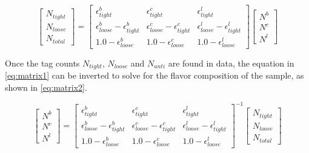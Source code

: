         \begin{equation}
            \begin{bmatrix} \scriptstyle
            N_{tight} \\ \scriptstyle
            N_{loose} \\ \scriptstyle
            N_{total}
            \end{bmatrix}    
            = 
            \begin{bmatrix} \scriptstyle
                \epsilon^b_{tight} & \scriptstyle \epsilon^c_{tight} & \scriptstyle \epsilon^l_{tight} \\  \scriptstyle
                \epsilon^b_{loose} - \epsilon^b_{tight} & \scriptstyle \epsilon^c_{loose} - \epsilon^c_{tight} & \scriptstyle \epsilon^l_{loose} - \epsilon^l_{tight} \\      \scriptstyle
                1.0 - \epsilon^b_{loose} & \scriptstyle 1.0 - \epsilon^c_{loose} & \scriptstyle  1.0 - \epsilon^l_{loose}
            \end{bmatrix}
            \begin{bmatrix} \scriptstyle
                N^b \\ \scriptstyle
                N^c \\ \scriptstyle
                N^l
            \end{bmatrix} 
        \end{equation} \label{eq:matrix1}

Once the tag counts $N_{tight}$, $N_{loose}$ and $N_{anti}$ are found in data, the equation in \ref{eq:matrix1} can be inverted to solve for the flavor composition of the sample, as shown in \ref{eq:matrix2}.


        \begin{equation}
            \begin{bmatrix} \scriptstyle
                N^b \\ \scriptstyle
                N^c \\ \scriptstyle
                N^l
            \end{bmatrix} 
            = 
            \begin{bmatrix} \scriptstyle
                \epsilon^b_{tight} & \scriptstyle \epsilon^c_{tight} & \scriptstyle \epsilon^l_{tight} \\  \scriptstyle
                \epsilon^b_{loose} - \epsilon^b_{tight} & \scriptstyle \epsilon^c_{loose} - \epsilon^c_{tight} & \scriptstyle \epsilon^l_{loose} - \epsilon^l_{tight} \\      \scriptstyle
                1.0 - \epsilon^b_{loose} & \scriptstyle 1.0 - \epsilon^c_{loose} & \scriptstyle  1.0 - \epsilon^l_{loose}
            \end{bmatrix}
            ^{-1}
            \begin{bmatrix} \scriptstyle
            N_{tight} \\ \scriptstyle
            N_{loose} \\ \scriptstyle
            N_{total}
            \end{bmatrix}    
        \end{equation} \label{eq:matrix2}

